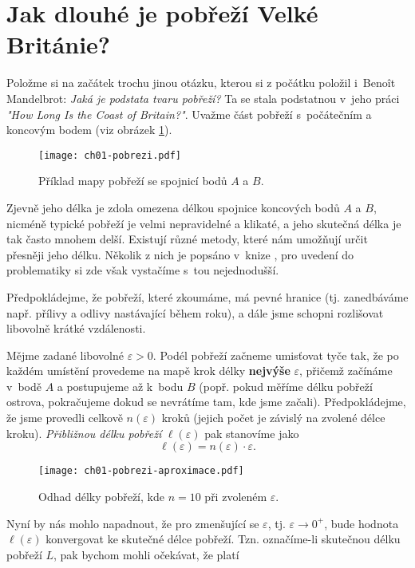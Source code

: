 \section{Jak dlouhé je pobřeží Velké Británie?}\label{sec:pobrezi_velke_britanie}
Položme si na začátek trochu jinou otázku, kterou si z počátku položil i~Benoît Mandelbrot: \emph{Jaká je podstata tvaru pobřeží?} Ta se stala podstatnou v~jeho práci \emph{"How Long Is the Coast of Britain?"}. Uvažme část pobřeží s~počátečním a koncovým bodem (viz obrázek \ref{fig:pobrezi}).
\begin{figure}[h]
    \centering
    \texttt{[image: ch01-pobrezi.pdf]}
    \caption{Příklad mapy pobřeží se spojnicí bodů $A$ a $B$.}
    \label{fig:pobrezi}
\end{figure}
Zjevně jeho délka je zdola omezena délkou spojnice koncových bodů $A$ a $B$, nicméně typické pobřeží je velmi nepravidelné a klikaté, a jeho skutečná délka je tak často mnohem delší. Existují různé metody, které nám umožňují určit přesněji jeho délku. Několik z nich je popsáno v~knize \citep[str. 79]{Mandelbrot1983}, pro uvedení do problematiky si zde však vystačíme s~tou nejednodušší.\par
Předpokládejme, že pobřeží, které zkoumáme, má pevné hranice (tj. zanedbáváme např. přílivy a odlivy nastávající během roku), a dále jsme schopni rozlišovat libovolně krátké vzdálenosti.\par
Mějme zadané libovolné $\varepsilon>0$. Podél pobřeží začneme umisťovat tyče tak, že po každém umístění provedeme na mapě krok délky \textbf{nejvýše} $\varepsilon$, přičemž začínáme v~bodě $A$ a postupujeme až k~bodu $B$ (popř. pokud měříme délku pobřeží ostrova, pokračujeme dokud se nevrátíme tam, kde jsme začali). Předpokládejme, že jsme provedli celkově $n(\varepsilon)$ kroků (jejich počet je závislý na zvolené délce kroku). \emph{Přibližnou délku pobřeží} $\ell(\varepsilon)$ pak stanovíme jako
\begin{equation*}
    \ell(\varepsilon)=n(\varepsilon)\cdot\varepsilon.
\end{equation*}
\begin{figure}[h]
    \centering
    \texttt{[image: ch01-pobrezi-aproximace.pdf]}
    \caption{Odhad délky pobřeží, kde $n=10$ při zvoleném $\varepsilon$.}
    \label{fig:pobrezi_aproximace}
\end{figure}
Nyní by nás mohlo napadnout, že pro zmenšující se $\varepsilon$, tj. $\varepsilon\to0^+$, bude hodnota $\ell(\varepsilon)$ konvergovat ke skutečné délce pobřeží. Tzn. označíme-li skutečnou délku pobřeží $L$, pak bychom mohli očekávat, že platí
